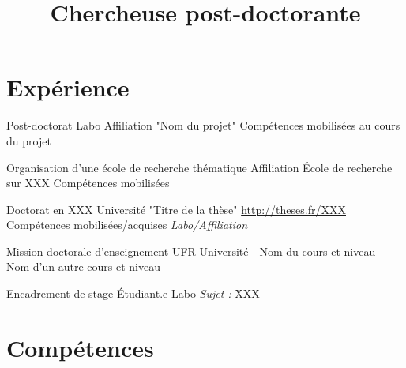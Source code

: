 \documentclass[11pt,a4paper,sans]{moderncv}        %
\title{Chercheuse post-doctorante}%
\begin{document}
\makecvtitle

\vspace{-0.8cm}


\section{Expérience}
%
{Post-doctorat}%
{Labo}%
{Affiliation}%
{}%
{"Nom du projet"\newline{}%
Compétences mobilisées au cours du projet}  %

\smallskip
{}%
{Organisation d'une école de recherche thématique}%
{}%
{Affiliation}%
{}%
{École de recherche sur XXX\newline{}%
Compétences mobilisées}  %

\smallskip
{}%
{Doctorat en XXX}%
{}%
{Université}%
{}%
{"Titre de la thèse" \url{http://theses.fr/XXX}\newline{}%
Compétences mobilisées/acquises\newline{}%
\textit{Labo/Affiliation}
}  %


\smallskip
{}%
{Mission doctorale d'enseignement}%
{UFR}%
{Université}%
{}%
{- Nom du cours et niveau\newline{}%
- Nom d'un autre cours et niveau}

\smallskip
{}%
{Encadrement de stage}%
{Étudiant.e}%
{Labo}%
{}%
{\textit{Sujet :} XXX}


\smallskip
\section{Compétences}

\smallskip
\end{document}
